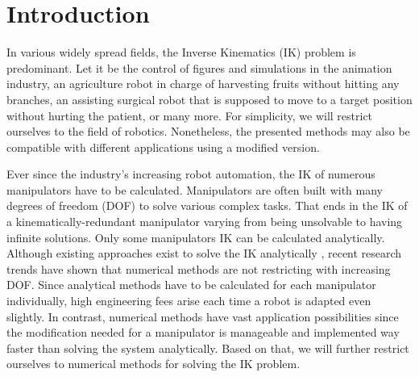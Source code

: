 \documentclass[conference]{IEEEtran}
\begin{document}
%
\IEEEpeerreviewmaketitle



\section{Introduction}
In various widely spread fields, the Inverse Kinematics (IK) problem is predominant. Let it be the control of figures and simulations in the animation industry, an agriculture robot in charge of harvesting fruits without hitting any branches, an assisting surgical robot that is supposed to move to a target position without hurting the patient, or many more. For simplicity, we will restrict ourselves to the field of robotics. Nonetheless, the presented methods may also be compatible with different applications using a modified version.

Ever since the industry's increasing robot automation\cite{Chiacchio2018impact}, the IK of numerous manipulators have to be calculated. Manipulators are often built with many degrees of freedom (DOF) to solve various complex tasks. That ends in the IK of a kinematically-redundant manipulator 
varying from being unsolvable to having infinite solutions. Only some manipulators IK can be calculated analytically\cite{springer_Kinematics}. Although existing approaches exist to solve the IK analytically\cite{chen_analyticalSolver} \cite{manocha_analyticalSolver}, recent research trends have shown that numerical methods are not restricting with increasing DOF. Since analytical methods have to be calculated for each manipulator individually, high engineering fees arise each time a robot is adapted even slightly. In contrast, numerical methods have vast application possibilities since the modification needed for a manipulator is manageable and implemented way faster than solving the system analytically. Based on that, we will further restrict ourselves to numerical methods for solving the IK problem.
\end{document}
